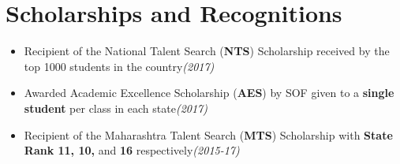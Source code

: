 \documentclass[10pt,a4paper,sans]{moderncv}        %
\newcommand{\rhsmall}[1]{\hfill{\footnotesize{\textsl{(#1)}}}}
\begin{document}
\section{Scholarships and Recognitions}
\vspace{0.2em}
\begin{itemize}
	\item Recipient of the National Talent Search (\textbf{NTS}) Scholarship received by the top 1000 students in the country\rhsmall{2017}
	\item Awarded Academic Excellence Scholarship (\textbf{AES}) by SOF given to a \textbf{single  student} per class in each state\rhsmall{2017}%
	\item Recipient of the Maharashtra Talent Search (\textbf{MTS}) Scholarship  with \textbf{State Rank 11, 10,} and \textbf{16} respectively\rhsmall{2015-17}%
\end{itemize}
\end{document}
